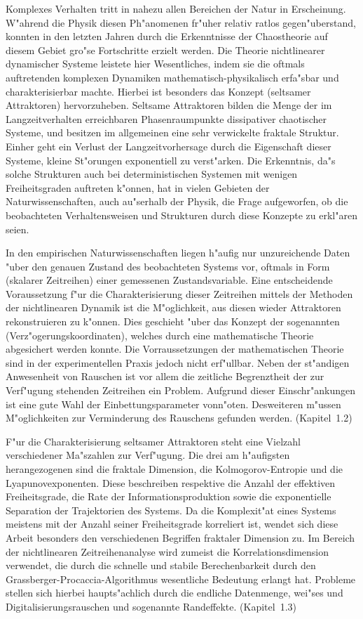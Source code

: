 
Komplexes Verhalten tritt in nahezu allen Bereichen der Natur in Erscheinung. W"ahrend die
Physik diesen Ph"anomenen fr"uher relativ ratlos gegen"uberstand, konnten in den letzten
Jahren durch die Erkenntnisse der Chaostheorie auf diesem Gebiet gro"se Fortschritte
erzielt werden. Die Theorie nichtlinearer dynamischer Systeme leistete hier Wesentliches,
indem sie die oftmals auftretenden komplexen Dynamiken mathematisch-physikalisch erfa"sbar
und charakterisierbar machte.  Hierbei ist besonders das Konzept \begriff(seltsamer Attraktoren)
hervorzuheben.  Seltsame Attraktoren bilden die Menge der im Langzeitverhalten
erreichbaren Phasenraumpunkte dissipativer chaotischer Systeme, und besitzen im allgemeinen
eine sehr verwickelte fraktale Struktur. Einher geht ein Verlust der Langzeitvorhersage
durch die Eigenschaft dieser Systeme, kleine St"orungen exponentiell zu verst"arken.  Die
Erkenntnis, da"s solche Strukturen auch bei deterministischen Systemen mit wenigen
Freiheitsgraden auftreten k"onnen, hat in vielen Gebieten der Naturwissenschaften, auch
au"serhalb der Physik, die Frage aufgeworfen, ob die beobachteten Verhaltensweisen und
Strukturen durch diese Konzepte zu erkl"aren seien.


In den empirischen Naturwissenschaften liegen h"aufig nur unzureichende Daten "uber den
genauen Zustand des beobachteten Systems vor, oftmals in Form \begriff(skalarer
Zeitreihen) einer gemessenen Zustandsvariable.  Eine entscheidende Voraussetzung f"ur die
Charakterisierung dieser Zeitreihen mittels der Methoden der nichtlinearen Dynamik ist
die M"oglichkeit, aus diesen wieder Attraktoren rekonstruieren zu k"onnen.  Dies geschieht
"uber das Konzept der sogenannten \begriff(Verz"ogerungskoordinaten), welches durch eine
mathematische Theorie abgesichert werden konnte. Die Vorraussetzungen der mathematischen
Theorie sind in der experimentellen Praxis jedoch nicht erf"ullbar. Neben der st"andigen
Anwesenheit von Rauschen ist vor allem die zeitliche Begrenztheit der zur Verf"ugung
stehenden Zeitreihen ein Problem. Aufgrund dieser Einschr"ankungen ist eine gute Wahl der
Einbettungsparameter vonn"oten.  Desweiteren m"ussen M"oglichkeiten zur Verminderung des
Rauschens gefunden werden. (Kapitel~1.2)

F"ur die Charakterisierung seltsamer Attraktoren steht eine Vielzahl verschiedener Ma"szahlen zur
Verf"ugung. Die drei am h"aufigsten herangezogenen sind die fraktale Dimension, die
Kolmogorov-Entropie und die Lyapunovexponenten. Diese beschreiben respektive die Anzahl
der effektiven Freiheitsgrade, die Rate der Informationsproduktion sowie die exponentielle
Separation der Trajektorien des Systems. Da die Komplexit"at eines Systems meistens mit
der Anzahl seiner Freiheitsgrade korreliert ist, wendet sich diese Arbeit besonders den
verschiedenen Begriffen fraktaler Dimension zu.  Im Bereich der nichtlinearen
Zeitreihenanalyse wird zumeist die Korrelationsdimension verwendet, die durch die schnelle
und stabile Berechenbarkeit durch den Grassberger-Procaccia-Algorithmus wesentliche
Bedeutung erlangt hat. Probleme stellen sich hierbei haupts"achlich durch die endliche
Datenmenge, wei"ses und Digitalisierungsrauschen und sogenannte Randeffekte.  (Kapitel~1.3)

